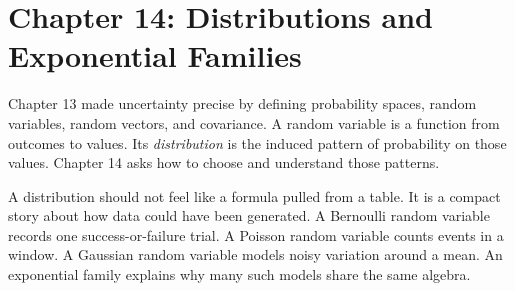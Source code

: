 \section{Chapter 14: Distributions and Exponential Families}
\label{ch:distributions-exponential-families}

Chapter 13 made uncertainty precise by defining probability spaces, random variables, random vectors, and covariance. A random variable is a function from outcomes to values. Its \emph{distribution} is the induced pattern of probability on those values. Chapter 14 asks how to choose and understand those patterns.

A distribution should not feel like a formula pulled from a table. It is a compact story about how data could have been generated. A Bernoulli random variable records one success-or-failure trial. A Poisson random variable counts events in a window. A Gaussian random variable models noisy variation around a mean. An exponential family explains why many such models share the same algebra.

